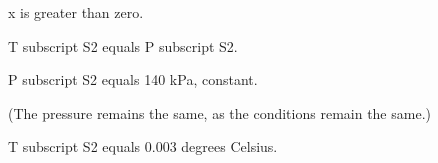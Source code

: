 x is greater than zero.

T subscript S2 equals P subscript S2.

P subscript S2 equals 140 kPa, constant.

(The pressure remains the same, as the conditions remain the same.)

T subscript S2 equals 0.003 degrees Celsius.